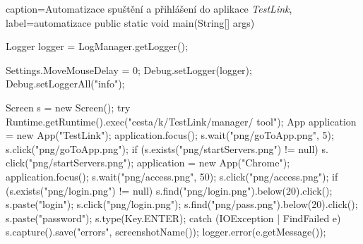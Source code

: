 \begin{lstjava}{caption={Automatizace spuštění a přihlášení do aplikace \emph{TestLink}}, label={automatizace}}
public static void main(String[] args) {
  Logger logger = LogManager.getLogger();

  Settings.MoveMouseDelay = 0;
  Debug.setLogger(logger);
  Debug.setLoggerAll("info");

  Screen s = new Screen();
  try {
    Runtime.getRuntime().exec("cesta/k/TestLink/manager/
      tool");
    App application = new App("TestLink");
    application.focus();
    s.wait("png/goToApp.png", 5);
    s.click("png/goToApp.png");
    if (s.exists("png/startServers.png") != null) s.
      click("png/startServers.png");
    application = new App("Chrome");
    application.focus();
    s.wait("png/access.png", 50);
    s.click("png/access.png");
    if (s.exists("png/login.png") != null) {
      s.find("png/login.png").below(20).click();
      s.paste("login");
      s.click("png/login.png");
      s.find("png/pass.png").below(20).click();
      s.paste("password");
      s.type(Key.ENTER);
    }
  } catch (IOException | FindFailed e) {
    s.capture().save("errors", screenshotName());
    logger.error(e.getMessage());
  }
}
\end{lstjava}